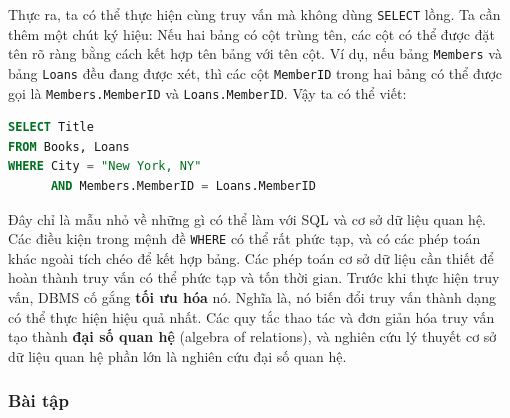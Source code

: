 Thực ra, ta có thể thực hiện cùng truy vấn mà không dùng \texttt{SELECT} lồng. Ta cần thêm một chút ký hiệu: Nếu hai bảng có cột trùng tên, các cột có thể được đặt tên rõ ràng bằng cách kết hợp tên bảng với tên cột. Ví dụ, nếu bảng \texttt{Members} và bảng \texttt{Loans} đều đang được xét, thì các cột \texttt{MemberID} trong hai bảng có thể được gọi là \texttt{Members.MemberID} và \texttt{Loans.MemberID}. Vậy ta có thể viết:

\begin{lstlisting}[language=SQL]
SELECT Title
FROM Books, Loans
WHERE City = "New York, NY"
      AND Members.MemberID = Loans.MemberID
\end{lstlisting}

Đây chỉ là mẫu nhỏ về những gì có thể làm với SQL và cơ sở dữ liệu quan hệ. Các điều kiện trong mệnh đề \texttt{WHERE} có thể rất phức tạp, và có các phép toán khác ngoài tích chéo để kết hợp bảng. Các phép toán cơ sở dữ liệu cần thiết để hoàn thành truy vấn có thể phức tạp và tốn thời gian. Trước khi thực hiện truy vấn, DBMS cố gắng \textbf{tối ưu hóa} nó. Nghĩa là, nó biến đổi truy vấn thành dạng có thể thực hiện hiệu quả nhất. Các quy tắc thao tác và đơn giản hóa truy vấn tạo thành \textbf{đại số quan hệ} (algebra of relations), và nghiên cứu lý thuyết cơ sở dữ liệu quan hệ phần lớn là nghiên cứu đại số quan hệ.

\subsubsection*{Bài tập}

